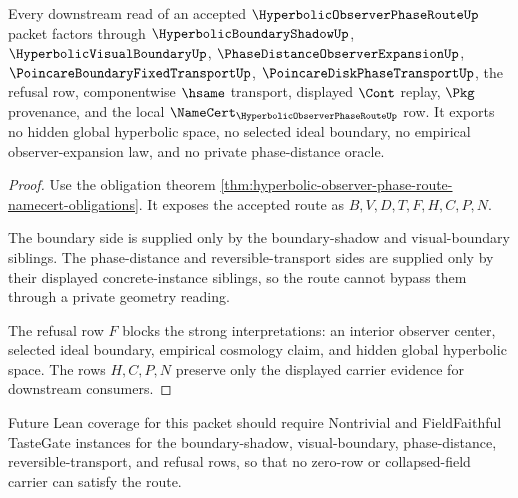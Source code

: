 \begin{theorem}
\label{thm:hyperbolic-observer-phase-route-finite-handoff}
Every downstream read of an accepted $\HyperbolicObserverPhaseRouteUp$ packet factors through $\HyperbolicBoundaryShadowUp$, $\HyperbolicVisualBoundaryUp$, $\PhaseDistanceObserverExpansionUp$, $\PoincareBoundaryFixedTransportUp$, $\PoincareDiskPhaseTransportUp$, the refusal row, componentwise $\hsame$ transport, displayed $\Cont$ replay, $\Pkg$ provenance, and the local $\NameCert_{\HyperbolicObserverPhaseRouteUp}$ row. It exports no hidden global hyperbolic space, no selected ideal boundary, no empirical observer-expansion law, and no private phase-distance oracle.
\end{theorem}
\begin{proof}
Use the obligation theorem \autoref{thm:hyperbolic-observer-phase-route-namecert-obligations}. It exposes the accepted route as $B,V,D,T,F,H,C,P,N$.

The boundary side is supplied only by the boundary-shadow and visual-boundary siblings. The phase-distance and reversible-transport sides are supplied only by their displayed concrete-instance siblings, so the route cannot bypass them through a private geometry reading.

The refusal row $F$ blocks the strong interpretations: an interior observer center, selected ideal boundary, empirical cosmology claim, and hidden global hyperbolic space. The rows $H,C,P,N$ preserve only the displayed carrier evidence for downstream consumers.
\end{proof}

Future Lean coverage for this packet should require Nontrivial and FieldFaithful TasteGate instances for the boundary-shadow, visual-boundary, phase-distance, reversible-transport, and refusal rows, so that no zero-row or collapsed-field carrier can satisfy the route.



